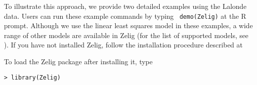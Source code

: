 To illustrate this approach, we provide two detailed examples using
the Lalonde data. Users can run these example commands by typing {\tt
  demo(Zelig)} at the R prompt. Although we use the linear least
squares model in these examples, a wide range of other models are
available in Zelig (for the list of supported models, see
).
If you have not installed Zelig, follow the installation procedure
described at


To load the Zelig package after installing it, type
\begin{verbatim}
> library(Zelig)
\end{verbatim}


